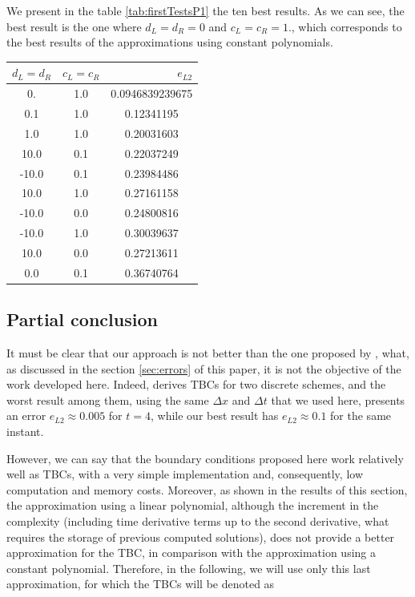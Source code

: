 \indent We present in the table \ref{tab:firstTestsP1} the ten best results. As we can see, the best result is the one where $d_L = d_R = 0$ and $c_L = c_R = 1. $, which corresponds to the best results of the approximations using constant polynomials.

\begin{center}
\begin{tabular}{c|c|S[round-precision=4,table-number-alignment =  left]}
	  &  &  \\
	. & 1.0 & 0.0946839239675 \\
	0.1 & 1.0 & 0.12341195 \\
	1.0 & 1.0 & 0.20031603 \\
	10.0 & 0.1 & 0.22037249 \\
	-10.0 & 0.1 & 0.23984486 \\
	10.0 & 1.0 & 0.27161158 \\
	-10.0 &  0.0 & 0.24800816\\
	-10.0 & 1.0 & 0.30039637 \\
	10.0 & 0.0 & 0.27213611 \\
	0.0 & 0.1 & 0.36740764
\end{tabular}
\end{center}

\subsection{Partial conclusion}

\indent It must be clear that our approach is not better than the one proposed by \cite{besse2015}, what, as discussed in the section \ref{sec:errors} of this paper, it is not the objective of the work developed here. Indeed, \cite{besse2015} derives TBCs for two discrete schemes, and the worst result among them, using the same $\Delta x $ and $\Delta t$ that we used here, presents an error $e_{L2} \approx 0.005$ for $t = 4$, while our best result has $e_{L2} \approx 0.1$ for the same instant.

\indent However, we can say that the boundary conditions proposed here work relatively well as TBCs, with a very simple implementation and, consequently, low computation and memory costs. Moreover, as shown in the results of this section, the approximation using a linear polynomial, although the increment in the complexity (including time derivative terms up to the second derivative, what requires the storage of previous computed solutions), does not provide a better approximation for the TBC, in comparison with the approximation using a constant polynomial. Therefore, in the following, we will use only this last approximation, for which the TBCs will be denoted as  

